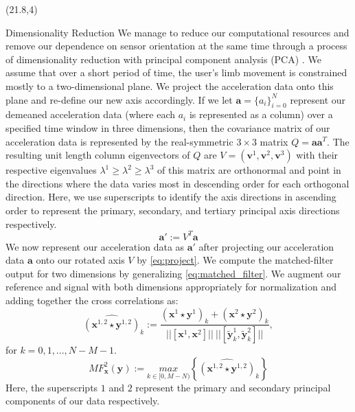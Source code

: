 \documentclass[unknownkeysallowed,final]{beamer}
\begin{document}
\begin{frame}{}
\begin{textblock}{18}(21.8,4)

\begin{block}{\small{Dimensionality Reduction}}
We manage to reduce our computational resources and remove our dependence on sensor orientation at the same time through a process of dimensionality reduction with principal component analysis (PCA) \cite{bishop_2006}.
We assume that over a short period of time, the user's limb movement is constrained mostly to a two-dimensional plane.
We project the acceleration data onto this plane and re-define our new axis accordingly.
If we let $\textbf{a} = \{a_i\}_{i=0}^{N}$ represent our demeaned acceleration data (where each $a_i$ is represented as a column) over a specified time window in three dimensions, then the covariance matrix of our acceleration data is represented by the real-symmetric $3 \times 3$ matrix $Q = \textbf{a} \textbf{a}^T$.
The resulting unit length column eigenvectors of $Q$ are $V = (\textbf{v}^1,\textbf{v}^2,\textbf{v}^3)$ with their respective eigenvalues $\lambda^1 \geq \lambda^2 \geq \lambda^3$ of this matrix are orthonormal and point in the directions where the data varies most in descending order for each orthogonal direction.
Here, we use superscripts to identify the axis directions in ascending order to represent the primary, secondary, and tertiary principal axis directions respectively.
%
\begin{equation} \label{eq:project}
   \textbf{a}' := V^T \textbf{a}
\end{equation}
%
We now represent our acceleration data as $\textbf{a}'$ after projecting our acceleration data $\textbf{a}$ onto our rotated axis $V$ by \eqref{eq:project}.
We compute the matched-filter output for two dimensions by generalizing \eqref{eq:matched_filter}.
We augment our reference and signal with both dimensions appropriately for normalization and adding together the cross correlations as:
%
\begin{equation} \label{eq:cross_correlation_2}
\widehat{(\textbf{x}^{1,2} \star \textbf{y}^{1,2})}_k := \frac{(\textbf{x}^1 \star \textbf{y}^1)_k + (\textbf{x}^2 \star \textbf{y}^2)_k}{||[ \textbf{x}^1, \textbf{x}^2 ]|| \ || [ \widetilde{\textbf{y}}_k^1, \widetilde{\textbf{y}}_k^2 ] || },
\end{equation}
%
for $ k = 0,1,...,N-M-1 $. \\
%
\begin{equation} \label{eq:matched_filter_2}
MF_{\textbf{x}}^2(\textbf{y}) := \underset{k \in [0, M-N)}{max} \left \{\widehat{(\textbf{x}^{1,2} \star \textbf{y}^{1,2})}_k \right \}
\end{equation}
%
Here, the superscripts $1$ and $2$ represent the primary and secondary principal components of our data respectively.
\end{block}


\end{textblock}
\end{frame}
\end{document}

